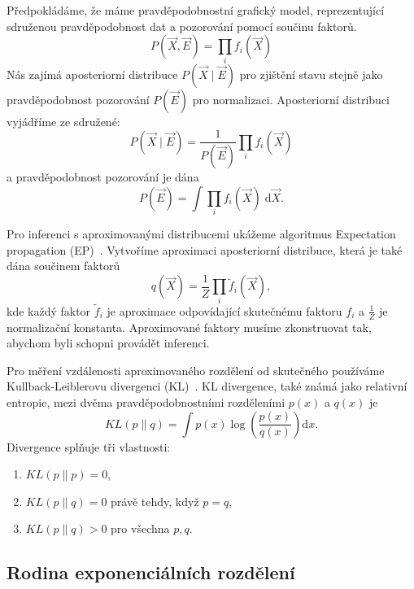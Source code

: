 Předpokládáme, že máme pravděpodobnostní grafický model, reprezentující sdruženou pravděpodobnost dat a pozorování pomocí součinu faktorů.
\begin{equation}
P(\vec{X}, \vec{E}) = \prod_i f_i(\vec{X})
\end{equation}
Nás zajímá aposteriorní distribuce $P(\vec{X} \mid \vec{E})$ pro zjištění stavu stejně jako pravděpodobnost pozorování $P(\vec{E})$ pro normalizaci.
Aposteriorní distribuci vyjádříme ze sdružené:
\begin{equation}
P(\vec{X} \mid \vec{E}) = \frac{1}{P(\vec{E})} \prod_i f_i(\vec{X})
\end{equation}
a pravděpodobnost pozorování je dána
\begin{equation}
P(\vec{E}) = \int \prod_i f_i(\vec{X}) \; \mathrm{d}\vec{X}.
\end{equation}

Pro inferenci s aproximovanými distribucemi ukážeme algoritmus Expectation propagation (EP)~\cite{minka2001expectation}.
Vytvoříme aproximaci aposteriorní distribuce, která je také dána součinem faktorů
\begin{equation}
q(\vec{X}) = \frac{1}{Z} \prod_i \tilde{f}_i(\vec{X}),
\end{equation}
kde každý faktor $\tilde{f}_i$ je aproximace odpovídající skutečnému faktoru $f_i$ a $\frac{1}{Z}$ je normalizační konstanta.
Aproximované faktory musíme zkonstruovat tak, abychom byli schopni provádět inferenci.

Pro měření vzdálenosti aproximovaného rozdělení od skutečného používáme Kullback-Leiblerovu divergenci (KL)~\cite{kullback1997information}.
KL divergence, také známá jako relativní entropie, mezi dvěma pravděpodobnostními rozděleními $p(x)$ a $q(x)$ je
\begin{equation}
KL(p \| q) = \int p(x) \log \left(\frac{p(x)}{q(x)}\right) \mathrm{d}x.
\end{equation}
Divergence splňuje tři vlastnosti:
\begin{enumerate}
\item $KL(p \| p) = 0$,
\item $KL(p \| q) = 0$ právě tehdy, když $p = q$,
\item $KL(p \| q) > 0$ pro všechna $p, q$.
\end{enumerate}

\subsection{Rodina exponenciálních rozdělení}
\label{sec:expfam}

